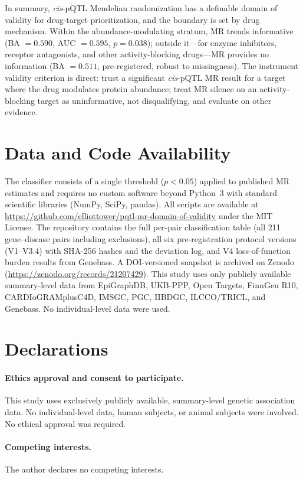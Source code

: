 \documentclass[11pt]{article}
\begin{document}
In summary, \emph{cis}-pQTL Mendelian randomization has a definable domain of validity for drug-target prioritization, and the boundary is set by drug mechanism. Within the abundance-modulating stratum, MR trends informative (BA $= 0.590$, AUC $= 0.595$, $p = 0.038$); outside it---for enzyme inhibitors, receptor antagonists, and other activity-blocking drugs---MR provides no information (BA $= 0.511$, pre-registered, robust to missingness). The instrument validity criterion is direct: trust a significant \emph{cis}-pQTL MR result for a target where the drug modulates protein abundance; treat MR silence on an activity-blocking target as uninformative, not disqualifying, and evaluate on other evidence.

\section*{Data and Code Availability}

The classifier consists of a single threshold ($p < 0.05$) applied to published MR estimates and requires no custom software beyond Python~3 with standard scientific libraries (NumPy, SciPy, pandas). All scripts are available at \url{https://github.com/elliottower/pqtl-mr-domain-of-validity} under the MIT License. The repository contains the full per-pair classification table (all 211 gene--disease pairs including exclusions), all six pre-registration protocol versions (V1--V3.4) with SHA-256 hashes and the deviation log, and V4 loss-of-function burden results from Genebass. A DOI-versioned snapshot is archived on Zenodo (\url{https://zenodo.org/records/21207429}). This study uses only publicly available summary-level data from EpiGraphDB, UKB-PPP, Open Targets, FinnGen R10, CARDIoGRAMplusC4D, IMSGC, PGC, IIBDGC, ILCCO/TRICL, and Genebass. No individual-level data were used.

\section*{Declarations}

\paragraph{Ethics approval and consent to participate.}
This study uses exclusively publicly available, summary-level genetic association data. No individual-level data, human subjects, or animal subjects were involved. No ethical approval was required.

\paragraph{Competing interests.}
The author declares no competing interests.
\end{document}
